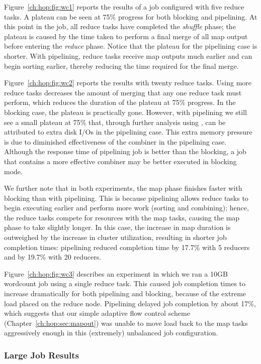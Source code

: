 Figure~\ref{ch:hop:fig:wc1} reports the results of a job configured with five
reduce tasks.  A plateau can be seen at 75\% progress for both blocking and
pipelining.  At this point in the job, all reduce tasks have completed the {\em
shuffle} phase; the plateau is caused by the time taken to perform a final
merge of all map output before entering the {\em reduce} phase.  Notice that
the plateau for the pipelining case is shorter.  With pipelining, reduce tasks
receive map outputs much earlier and can begin sorting earlier, thereby
reducing the time required for the final merge.

Figure~\ref{ch:hop:fig:wc2} reports the results with twenty reduce tasks.
Using more reduce tasks decreases the amount of merging that any one reduce
task must perform, which reduces the duration of the plateau at 75\% progress.
In the blocking case, the plateau is practically gone.  However, with
pipelining we still see a small plateau at 75\% that, through further analysis
using , can be attributed to extra disk I/Os in the pipelining case.
This extra memory pressure is due to diminished effectiveness of the combiner
in the pipelining case.  Although the response time of pipelining job is better
than the blocking, a job that contains a more effective combiner may be better
executed in blocking mode.

We further note that in both experiments, the map phase finishes faster with
blocking than with pipelining.  This is because pipelining allows reduce tasks
to begin executing earlier and perform more work (sorting and combining);
hence, the reduce tasks compete for resources with the map tasks, causing the
map phase to take slightly longer.  In this case, the increase in map duration
is outweighed by the increase in cluster utilization, resulting in shorter job
completion times: pipelining reduced completion time by 17.7\% with 5 reducers
and by 19.7\% with 20 reducers.

Figure~\ref{ch:hop:fig:wc3} describes an experiment in which we ran a 10GB
wordcount job using a single reduce task.  This caused job completion times to
increase dramatically for both pipelining and blocking, because of the extreme
load placed on the reduce node.  Pipelining delayed job completion by about
17\%, which suggests that our simple adaptive flow control scheme
(Chapter~\ref{ch:hop:sec:mapout}) was unable to move load back to the map tasks
aggressively enough in this (extremely) unbalanced job configuration.

\subsubsection{Large Job Results}

